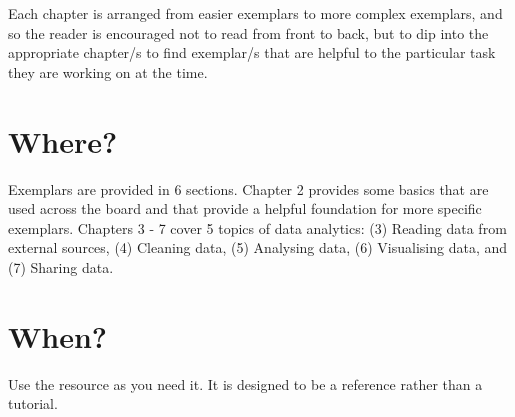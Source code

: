 Each chapter is arranged from easier exemplars to more complex exemplars, and so the reader is encouraged not to read from front to back, but to dip into the appropriate chapter/s to find exemplar/s that are helpful to the particular task they are working on at the time.

\section{Where?}

Exemplars are provided in 6 sections. Chapter 2 provides some basics that are used across the board and that provide a helpful foundation for more specific exemplars. Chapters 3 - 7 cover 5 topics of data analytics: (3) Reading data from external sources, (4) Cleaning data, (5) Analysing data, (6) Visualising data, and (7) Sharing data.

\section{When?}

Use the resource as you need it. It is designed to be a reference rather than a tutorial.